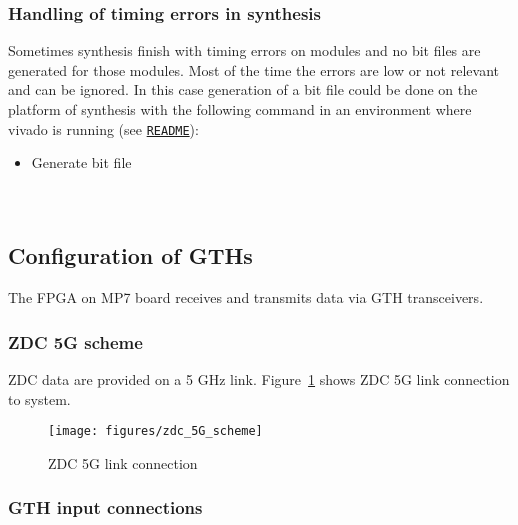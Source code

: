 \subsubsection{Handling of timing errors in synthesis}\label{sec:app:synth_timing_errors}

Sometimes synthesis finish with timing errors on modules and no bit files are generated for those modules.
Most of the time the errors are low or not relevant and can be ignored. In this case generation
of a bit file could be done on the platform of synthesis with the following command in an environment where
vivado is running (see \href{\gitbranch/README.md}{\texttt{README}}):\\
\begin{itemize}
\item Generate bit file\\
\\
\\
\end{itemize}

\clearpage

\subsection{Configuration of GTHs}\label{sec:app:app_a}

The FPGA on MP7 board receives and transmits data via GTH transceivers.\\

\subsubsection{ZDC 5G scheme}\label{sec:app:zdc_5g_scheme}

ZDC data are provided on a 5 GHz link.
Figure~\ref{fig:app:zdc_5G_scheme} shows ZDC 5G link connection to \ugt system.\\

\begin{figure}[htb]
\centering
\texttt{[image: figures/zdc\_5G\_scheme]}
\caption{ZDC 5G link connection}
\label{fig:app:zdc_5G_scheme}
\end{figure}

\clearpage

\subsubsection{GTH input connections}\label{sec:app:gth_i_conn}


